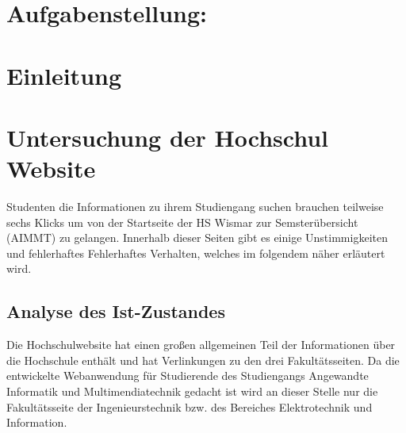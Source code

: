 \documentclass[12pt,					%
							 oneside,			%
							 a4paper,			%
							 halfparskip,		%
							 liststotoc,			%
							 bibtotoc,			%
							 fleqn,				%
							 pointlessnumbers]	%
							 {scrreprt}
\newcommand{\blankpage}{
	\newpage
	\thispagestyle{empty}
	\mbox{}
	\newpage
}
\begin{document}
	\onehalfspacing 					%
	
	\tableofcontents					%

\newpage
\chapter*{Aufgabenstellung:}

\newpage

\chapter{Einleitung}

\chapter{Untersuchung der Hochschul Website}	
Studenten die Informationen zu ihrem Studiengang suchen brauchen teilweise sechs Klicks um von der Startseite der HS Wismar zur Semsterübersicht (AIMMT) zu gelangen. Innerhalb dieser Seiten gibt es einige Unstimmigkeiten und fehlerhaftes Fehlerhaftes Verhalten, welches im folgendem näher erläutert wird.
		\section{Analyse des Ist-Zustandes}
		Die Hochschulwebsite hat einen großen allgemeinen Teil der Informationen über die Hochschule enthält und hat Verlinkungen zu den drei Fakultätsseiten. Da die entwickelte Webanwendung für Studierende des Studiengangs Angewandte Informatik und Multimendiatechnik gedacht ist wird an dieser Stelle nur die Fakultätsseite der Ingenieurstechnik bzw. des Bereiches Elektrotechnik und Information.
		
\end{document}
